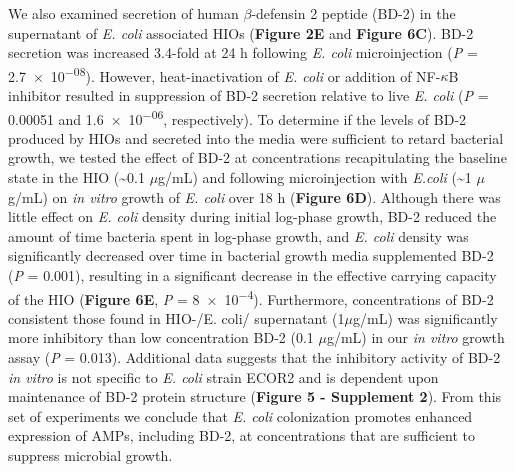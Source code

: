 \documentclass[9pt,lineo]{elife}
\begin{document}
We also examined secretion of human \(\beta\)-defensin 2 peptide (BD-2) in the supernatant of \emph{E. coli} associated HIOs (\textbf{Figure 2E} and \textbf{Figure 6C}). BD-2 secretion was increased 3.4-fold at 24 h following \emph{E. coli} microinjection (\emph{P} = \num{2.7e-08}). However, heat-inactivation of \emph{E. coli} or addition of NF-\(\kappa\)B inhibitor resulted in suppression of BD-2 secretion relative to live \emph{E. coli} (\emph{P} = \num{0.00051} and \num{1.6e-06}, respectively). To determine if the levels of BD-2 produced by HIOs and secreted into the media were sufficient to retard bacterial growth, we tested the effect of BD-2 at concentrations recapitulating the baseline state in the HIO (\textasciitilde{}0.1 \(\mu\)g/mL) and following microinjection with \emph{E.coli} (\textasciitilde{}1 \(\mu\)g/mL) on \emph{in vitro} growth of \emph{E. coli} over 18 h (\textbf{Figure 6D}). Although there was little effect on \emph{E. coli} density during initial log-phase growth, BD-2 reduced the amount of time bacteria spent in log-phase growth, and \emph{E. coli} density was significantly decreased over time in bacterial growth media supplemented BD-2 (\emph{P} = \num{0.001}), resulting in a significant decrease in the effective carrying capacity of the HIO (\textbf{Figure 6E}, \emph{P} = \num{8e-4}). Furthermore, concentrations of BD-2 consistent those found in HIO-/E. coli/ supernatant (1\(\mu\)g/mL) was significantly more inhibitory than low concentration BD-2 (0.1 \(\mu\)g/mL) in our \emph{in vitro} growth assay (\emph{P} = 0.013). Additional data suggests that the inhibitory activity of BD-2 \emph{in vitro} is not specific to \emph{E. coli} strain ECOR2 and is dependent upon maintenance of BD-2 protein structure (\textbf{Figure 5 - Supplement 2}). From this set of experiments we conclude that \emph{E. coli} colonization promotes enhanced expression of AMPs, including BD-2, at concentrations that are sufficient to suppress microbial growth.
\end{document}
